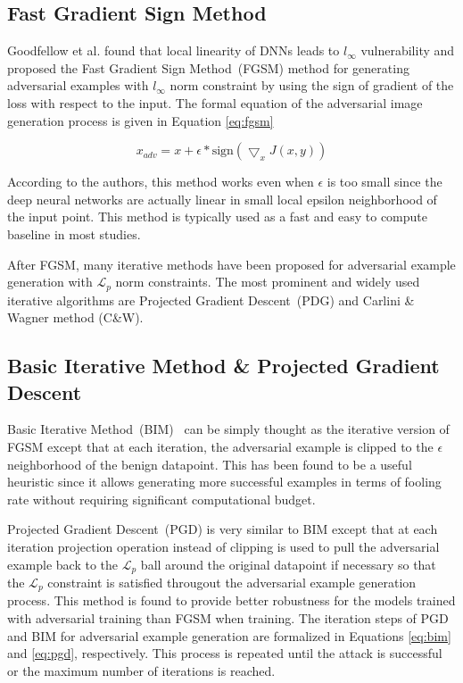\subsection{Fast Gradient Sign Method}

Goodfellow et al. found that local linearity of DNNs leads to \(l_\infty\) vulnerability \cite{goodfellow2014explaining} and proposed the Fast Gradient Sign Method~(FGSM) method for generating adversarial examples with \(l_\infty\) norm constraint by using the sign of gradient of the loss with respect to the input. The formal equation of the adversarial image generation process is given in Equation \ref{eq:fgsm}

\begin{equation}
    \label{eq:fgsm}
    x_{adv} = x + \epsilon * \text{sign}(\bigtriangledown_{x}J(x,y))
\end{equation}

According to the authors, this method works even when \(\epsilon\) is too small since the deep neural networks are actually linear in small local epsilon neighborhood of the input point. This method is typically used as a fast and easy to compute baseline in most studies.

After FGSM, many iterative methods have been proposed for adversarial example generation with \(\mathcal{L}_p\) norm constraints. The most prominent and widely used iterative algorithms are Projected Gradient Descent~(PDG) and Carlini \& Wagner method (C\&W).

\subsection{Basic Iterative Method \& Projected Gradient Descent}
Basic Iterative Method~(BIM)~\cite{kurakin2018adversarialphys} can be simply thought as the iterative version of FGSM except that at each iteration, the adversarial example is clipped to the \(\epsilon\) neighborhood of the benign datapoint. This has been found to be a useful heuristic since it allows generating more successful examples in terms of fooling rate without requiring significant computational budget.

Projected Gradient Descent~(PGD) \cite{madry2017towards} is very similar to BIM except that at each iteration projection operation instead of clipping is used to pull the adversarial example back to the \(\mathcal{L}_p\) ball around the original datapoint if necessary so that the \(\mathcal{L}_p\) constraint is satisfied througout the adversarial example generation process. This method is found to provide better robustness for the models trained with adversarial training than FGSM when training. The iteration steps of PGD and BIM for adversarial example generation are formalized in Equations \ref{eq:bim} and \ref{eq:pgd}, respectively. This process is repeated until the attack is successful or the maximum number of iterations is reached.

